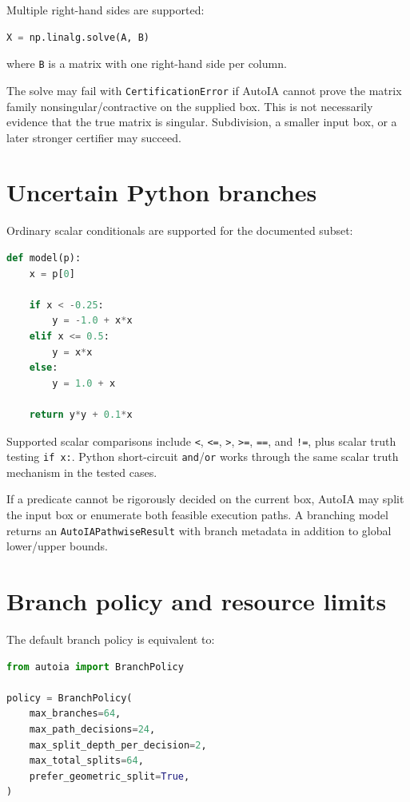 \documentclass[11pt]{article}
\begin{document}
Multiple right-hand sides are supported:
\begin{lstlisting}[language=Python]
X = np.linalg.solve(A, B)
\end{lstlisting}
where \texttt{B} is a matrix with one right-hand side per column.

The solve may fail with \texttt{CertificationError} if AutoIA cannot prove the
matrix family nonsingular/contractive on the supplied box.  This is not
necessarily evidence that the true matrix is singular.  Subdivision, a smaller
input box, or a later stronger certifier may succeed.

\section{Uncertain Python branches}

Ordinary scalar conditionals are supported for the documented subset:
\begin{lstlisting}[language=Python]
def model(p):
    x = p[0]

    if x < -0.25:
        y = -1.0 + x*x
    elif x <= 0.5:
        y = x*x
    else:
        y = 1.0 + x

    return y*y + 0.1*x
\end{lstlisting}

Supported scalar comparisons include \texttt{<}, \texttt{<=}, \texttt{>},
\texttt{>=}, \texttt{==}, and \texttt{!=}, plus scalar truth testing
\texttt{if x:}.  Python short-circuit \texttt{and}/\texttt{or} works through the
same scalar truth mechanism in the tested cases.

If a predicate cannot be rigorously decided on the current box, AutoIA may split
the input box or enumerate both feasible execution paths.  A branching model
returns an \texttt{AutoIAPathwiseResult} with branch metadata in addition to
global lower/upper bounds.

\section{Branch policy and resource limits}

The default branch policy is equivalent to:
\begin{lstlisting}[language=Python]
from autoia import BranchPolicy

policy = BranchPolicy(
    max_branches=64,
    max_path_decisions=24,
    max_split_depth_per_decision=2,
    max_total_splits=64,
    prefer_geometric_split=True,
)
\end{lstlisting}
\end{document}
